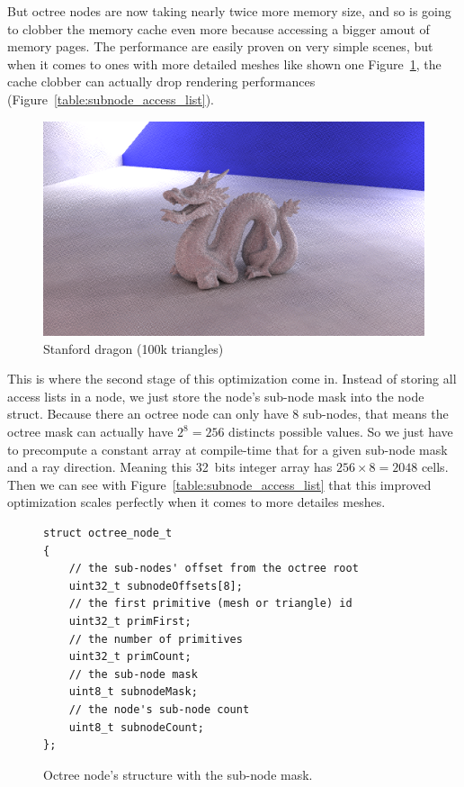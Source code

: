 \documentclass[10pt,twocolumn,a4paper]{article}
\begin{document}
But octree nodes are now taking nearly twice more memory size, and so is going
to clobber the memory cache even more because accessing a bigger amout of
memory pages. The performance are easily proven on very simple scenes, but when it comes
to ones with more detailed meshes like shown one Figure~\ref{fig:stanford_dragon}, the cache
clobber can actually drop rendering performances (Figure~\ref{table:subnode_access_list}).

\begin{figure}[h]
    \centering
    \includegraphics[width=0.8\columnwidth]{render_stanford_dragon.png}
    \caption{Stanford dragon (100k triangles)}
    \label{fig:stanford_dragon}
\end{figure}

This is where the second stage of this optimization come in. Instead of storing
all access lists in a node, we just store the node's sub-node mask into the
node struct. Because there an octree node can only have 8 sub-nodes, that
means the octree mask can actually have $2^8 = 256$ distincts possible values.
So we just have to precompute a constant array at compile-time that for a given sub-node mask
and a ray direction. Meaning this 32~bits integer array has $256 \times 8 = 2048$
cells. Then we can see with Figure~\ref{table:subnode_access_list} that this
improved optimization scales perfectly when it comes to more detailes meshes.

\begin{figure}[H]
    \centering
    \begin{lstlisting}[morekeywords={uint8_t,uint32_t}]
struct octree_node_t
{
    // the sub-nodes' offset from the octree root
    uint32_t subnodeOffsets[8];
    // the first primitive (mesh or triangle) id
    uint32_t primFirst;
    // the number of primitives
    uint32_t primCount;
    // the sub-node mask
    uint8_t subnodeMask;
    // the node's sub-node count
    uint8_t subnodeCount;
};
    \end{lstlisting}
    \caption{Octree node's structure with the sub-node mask.}
    \label{code:mask_access_list}
\end{figure}
\end{document}
